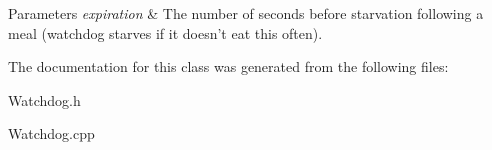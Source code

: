 \begin{DoxyParams}{\-Parameters}
{\em expiration} & \-The number of seconds before starvation following a meal (watchdog starves if it doesn't eat this often). \\
\hline
\end{DoxyParams}


\-The documentation for this class was generated from the following files\-:\begin{DoxyCompactItemize}
\item 
\-Watchdog.\-h\item 
\-Watchdog.\-cpp\end{DoxyCompactItemize}
